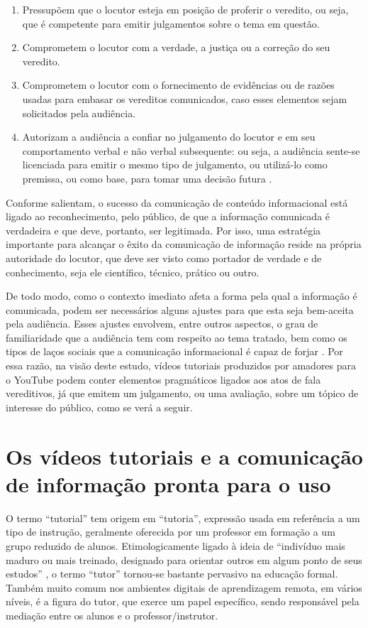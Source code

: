 \documentclass[portuguese]{textolivre}
\begin{document}
\begin{enumerate}
    \item Pressupõem que o locutor esteja em posição de proferir o veredito, ou seja, que é competente para emitir julgamentos sobre o tema em questão.
    \item Comprometem o locutor com a verdade, a justiça ou a correção do seu veredito.
    \item Comprometem o locutor com o fornecimento de evidências ou de razões usadas para embasar os vereditos comunicados, caso esses elementos sejam solicitados pela audiência.
    \item Autorizam a audiência a confiar no julgamento do locutor e em seu comportamento verbal e não verbal subsequente: ou seja, a audiência sente-se licenciada para emitir o mesmo tipo de julgamento, ou utilizá-lo como premissa, ou como base, para tomar uma decisão futura \cite[p. 80]{labinza2021}.
\end{enumerate}

Conforme \textcite{labinza2021} salientam, o sucesso da comunicação de conteúdo informacional está ligado ao reconhecimento, pelo público, de que a informação comunicada é verdadeira e que deve, portanto, ser legitimada. Por isso, uma estratégia importante para alcançar o êxito da comunicação de informação reside na própria autoridade do locutor, que deve ser visto como portador de verdade e de conhecimento, seja ele científico, técnico, prático ou outro.

De todo modo, como o contexto imediato afeta a forma pela qual a informação é comunicada, podem ser necessários alguns ajustes para que esta seja bem-aceita pela audiência.  Esses ajustes envolvem, entre outros aspectos, o grau de familiaridade que a audiência tem com respeito ao tema tratado, bem como os tipos de laços sociais que a comunicação informacional é capaz de forjar \cite{miller2008, xie2021}. Por essa razão, na visão deste estudo, vídeos tutoriais produzidos por amadores para o YouTube podem conter elementos pragmáticos ligados aos atos de fala vereditivos, já que emitem um julgamento, ou uma avaliação, sobre um tópico de interesse do público, como se verá a seguir.


\section{Os vídeos tutoriais e a comunicação de informação {\textquotedbl}pronta para o uso{\textquotedbl}}\label{sec-formato}

O termo “tutorial” tem origem em “tutoria”, expressão usada em referência a um tipo de instrução, geralmente oferecida por um professor em formação a um grupo reduzido de alunos. Etimologicamente ligado à ideia de “indivíduo mais maduro ou mais treinado, designado para orientar outros em algum ponto de seus estudos” \cite{tarquini2019}, o termo “tutor” tornou-se bastante pervasivo na educação formal. Também muito comum nos ambientes digitais de aprendizagem remota, em vários níveis, é a figura do tutor, que exerce um papel específico, sendo responsável pela mediação entre os alunos e o professor/instrutor.
\end{document}
